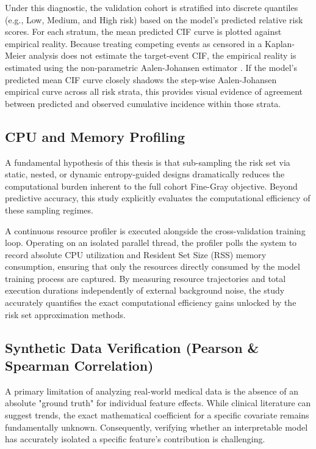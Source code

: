 \documentclass[a4paper,twoside,12pt]{report}
\begin{document}
Under this diagnostic, the validation cohort is stratified into discrete quantiles (e.g., Low, Medium, and High risk) based on the model's predicted relative risk scores. For each stratum, the mean predicted CIF curve is plotted against empirical reality. Because treating competing events as censored in a Kaplan-Meier analysis does not estimate the target-event CIF, the empirical reality is estimated using the non-parametric Aalen-Johansen estimator \citep{aalen1978empirical}. If the model's predicted mean CIF curve closely shadows the step-wise Aalen-Johansen empirical curve across all risk strata, this provides visual evidence of agreement between predicted and observed cumulative incidence within those strata.

\subsection{CPU and Memory Profiling}
A fundamental hypothesis of this thesis is that sub-sampling the risk set via static, nested, or dynamic entropy-guided designs dramatically reduces the computational burden inherent to the full cohort Fine-Gray objective. Beyond predictive accuracy, this study explicitly evaluates the computational efficiency of these sampling regimes.

A continuous resource profiler is executed alongside the cross-validation training loop. Operating on an isolated parallel thread, the profiler polls the system to record absolute CPU utilization and Resident Set Size (RSS) memory consumption, ensuring that only the resources directly consumed by the model training process are captured. By measuring resource trajectories and total execution durations independently of external background noise, the study accurately quantifies the exact computational efficiency gains unlocked by the risk set approximation methods.

\subsection{Synthetic Data Verification (Pearson \& Spearman Correlation)}
A primary limitation of analyzing real-world medical data is the absence of an absolute "ground truth" for individual feature effects. While clinical literature can suggest trends, the exact mathematical coefficient for a specific covariate remains fundamentally unknown. Consequently, verifying whether an interpretable model has accurately isolated a specific feature's contribution is challenging.
\end{document}
